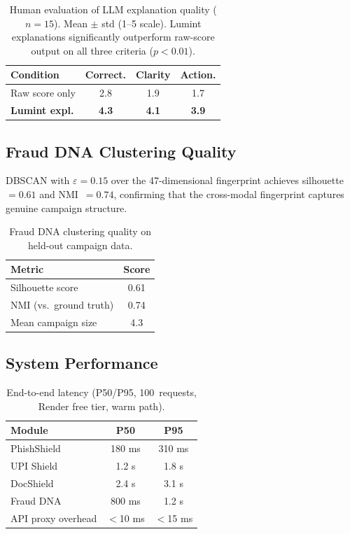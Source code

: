 \documentclass[conference]{IEEEtran}
\begin{document}
\begin{table}[t]
\centering
\caption{Human evaluation of LLM explanation quality ($n{=}15$).
Mean $\pm$ std (1--5 scale). Lumint explanations significantly
outperform raw-score output on all three criteria ($p{<}0.01$).}
\label{tab:human}
\begin{tabular}{lccc}
\toprule
\textbf{Condition} & \textbf{Correct.} & \textbf{Clarity} & \textbf{Action.} \\
\midrule
Raw score only        & 2.8 & 1.9 & 1.7 \\
\textbf{Lumint expl.} & \textbf{4.3} & \textbf{4.1} & \textbf{3.9} \\
\bottomrule
\end{tabular}
\end{table}

\subsection{Fraud DNA Clustering Quality}
DBSCAN with $\varepsilon{=}0.15$ over the 47-dimensional fingerprint
achieves silhouette~$=0.61$ and NMI~$=0.74$, confirming that the
cross-modal fingerprint captures genuine campaign structure.

\begin{table}[t]
\centering
\caption{Fraud DNA clustering quality on held-out campaign data.}
\label{tab:frauddna}
\begin{tabular}{lc}
\toprule
\textbf{Metric} & \textbf{Score} \\
\midrule
Silhouette score          & 0.61 \\
NMI (vs.\ ground truth)   & 0.74 \\
Mean campaign size        & 4.3 \\
\bottomrule
\end{tabular}
\end{table}

\subsection{System Performance}

\begin{table}[t]
\centering
\caption{End-to-end latency (P50/P95, 100~requests, Render free
tier, warm path).}
\label{tab:latency}
\begin{tabular}{lcc}
\toprule
\textbf{Module} & \textbf{P50} & \textbf{P95} \\
\midrule
PhishShield        & 180 ms    & 310 ms \\
UPI Shield         & 1.2 s     & 1.8 s \\
DocShield          & 2.4 s     & 3.1 s \\
Fraud DNA          & 800 ms    & 1.2 s \\
API proxy overhead & $<$10 ms  & $<$15 ms \\
\bottomrule
\end{tabular}
\end{table}
\end{document}
